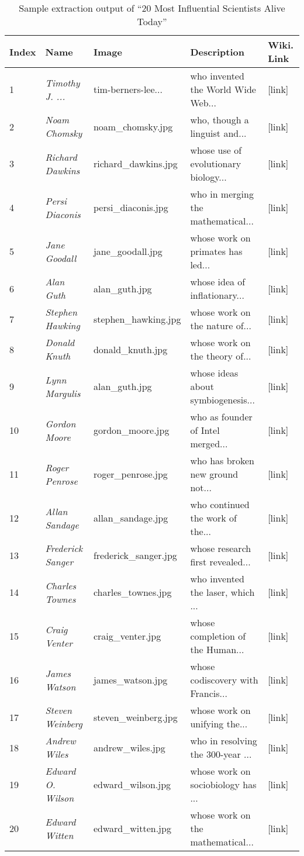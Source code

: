 \begin{table}
\centering
\caption{Sample extraction output of ``20 Most Influential Scientists Alive Today'' \cite{InfluentialScientists}}
\begin{tabular}{|l|l|l|l|l|} \hline
{\bf Index} & {\bf Name} & {\bf Image} & {\bf Description} & {\bf Wiki. Link} \\ \hline
1 & {\em Timothy J. ...} & tim-berners-lee... &     who invented the World Wide Web... & [link]\\
2 & {\em Noam Chomsky} & noam\_chomsky.jpg &        who, though a linguist and... & [link]\\
3 & {\em Richard Dawkins} & richard\_dawkins.jpg &  whose use of evolutionary biology... & [link] \\
4 & {\em Persi Diaconis} & persi\_diaconis.jpg &    who in merging the mathematical... & [link] \\
5 & {\em Jane Goodall} & jane\_goodall.jpg &        whose work on primates has led... & [link] \\
6 & {\em Alan Guth} & alan\_guth.jpg &              whose idea of inflationary... & [link] \\
7 & {\em Stephen Hawking} & stephen\_hawking.jpg &  whose work on the nature of... & [link] \\
8 & {\em Donald Knuth} & donald\_knuth.jpg &        whose work on the theory of... & [link] \\
9 & {\em Lynn Margulis} & alan\_guth.jpg &          whose ideas about symbiogenesis... & [link] \\
10 & {\em Gordon Moore} & gordon\_moore.jpg &       who as founder of Intel merged... & [link] \\
11 & {\em Roger Penrose} & roger\_penrose.jpg &     who has broken new ground not... & [link] \\
12 & {\em Allan Sandage} & allan\_sandage.jpg &     who continued the work of the... & [link] \\
13 & {\em Frederick Sanger} & frederick\_sanger.jpg & whose research first revealed... & [link] \\
14 & {\em Charles Townes} & charles\_townes.jpg &   who invented the laser, which ... & [link] \\
15 & {\em Craig Venter} & craig\_venter.jpg &       whose completion of the Human... & [link] \\
16 & {\em James Watson} & james\_watson.jpg &       whose codiscovery with Francis... & [link] \\
17 & {\em Steven Weinberg} & steven\_weinberg.jpg & whose work on unifying the... & [link] \\
18 & {\em Andrew Wiles} & andrew\_wiles.jpg &       who in resolving the 300-year ... & [link] \\
19 & {\em Edward O. Wilson} & edward\_wilson.jpg &  whose work on sociobiology has ... & [link] \\
20 & {\em Edward Witten} & edward\_witten.jpg &     whose work on the mathematical... & [link] \\
\hline
\end{tabular}

\label{tab:sampleoutput}
\end{table}


